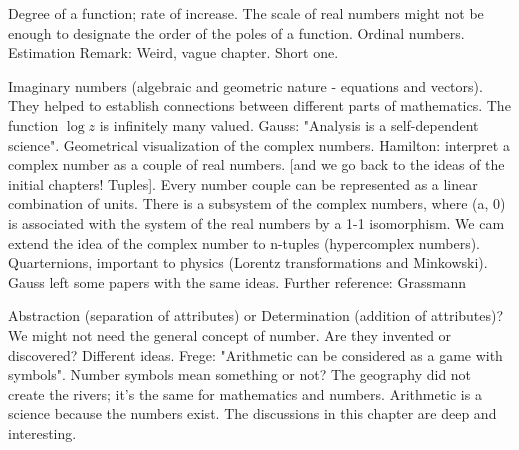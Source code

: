 \documentclass{cornell}
\begin{document}
%
{Degree of a function; rate of increase. The scale of real numbers might not be enough to designate the order of the poles of a function. Ordinal numbers. Estimation}%
{Remark: Weird, vague chapter. Short one.}%

%
{Imaginary numbers (algebraic and geometric nature - equations and vectors). They helped to establish connections between different parts of mathematics. The function \( \log z \) is infinitely many valued. Gauss: "Analysis is a self-dependent science". Geometrical visualization of the complex numbers. Hamilton: interpret a complex number as a couple of real numbers. [and we go back to the ideas of the initial chapters! Tuples]. Every number couple can be represented as a linear combination of units. There is a subsystem of the complex numbers, where (a, 0) is associated with the system of the real numbers by a 1-1 isomorphism. We cam extend the idea of the complex number to n-tuples (hypercomplex numbers). Quarternions, important to physics (Lorentz transformations and Minkowski). Gauss left some papers with the same ideas. }%
{Further reference: Grassmann}%

%
{Abstraction (separation of attributes) or Determination (addition of attributes)? We might not need the general concept of number. Are they invented or discovered? Different ideas. Frege: "Arithmetic can be considered as a game with symbols". Number symbols mean something or not? The geography did not create the rivers; it's the same for mathematics and numbers. Arithmetic is a science because the numbers exist. The discussions in this chapter are deep and interesting. }%



\end{document}
